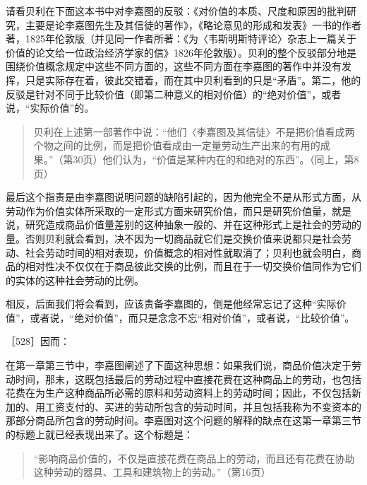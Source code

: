 请看贝利在下面这本书中对李嘉图的反驳：《对价值的本质、尺度和原因的批判研究，主要是论李嘉图先生及其信徒的著作》，《略论意见的形成和发表》一书的作者著，1825年伦敦版（并见同一作者所著：《为〈韦斯明斯特评论〉杂志上一篇关于价值的论文给一位政治经济学家的信》1826年伦敦版）。贝利的整个反驳部分地是围绕价值概念规定中这些不同方面的，这些不同方面在李嘉图的著作中并没有发挥，只是实际存在着，彼此交错着，而在其中贝利看到的只是“矛盾”。第二，他的反驳是针对不同于比较价值（即第二种意义的相对价值）的“绝对价值”，或者说，“实际价值”的。

\begin{quote}{贝利在上述第一部著作中说：“他们〈李嘉图及其信徒〉不是把价值看成两个物之间的比例，而是把价值看成由一定量劳动生产出来的有用的成果。”（第30页）他们认为，“价值是某种内在的和绝对的东西”。（同上，第8页）}\end{quote}

最后这个指责是由李嘉图说明问题的缺陷引起的，因为他完全不是从形式方面，从劳动作为价值实体所采取的一定形式方面来研究价值，而只是研究价值量，就是说，研究造成商品价值量差别的这种抽象一般的、并在这种形式上是社会的劳动的量。否则贝利就会看到，决不因为一切商品就它们是交换价值来说都只是社会劳动、社会劳动时间的相对表现，价值概念的相对性就取消了；贝利也就会明白，商品的相对性决不仅仅在于商品彼此交换的比例，而且在于一切交换价值同作为它们的实体的这种社会劳动的比例。

相反，后面我们将会看到，应该责备李嘉图的，倒是他经常忘记了这种“实际价值”，或者说，“绝对价值”，而只是念念不忘“相对价值”，或者说，“比较价值”。

［528］因而：



在第一章第三节中，李嘉图阐述了下面这种思想：如果我们说，商品价值决定于劳动时间，那末，这既包括最后的劳动过程中直接花费在这种商品上的劳动，也包括花费在为生产这种商品所必需的原料和劳动资料上的劳动时间；因此，不仅包括新加的、用工资支付的、买进的劳动所包含的劳动时间，并且包括我称为不变资本的那部分商品所包含的劳动时间。李嘉图对这个问题的解释的缺点在这第一章第三节的标题上就已经表现出来了。这个标题是：

\begin{quote}{“影响商品价值的，不仅是直接花费在商品上的劳动，而且还有花费在协助这种劳动的器具、工具和建筑物上的劳动。”（第16页）}\end{quote}

